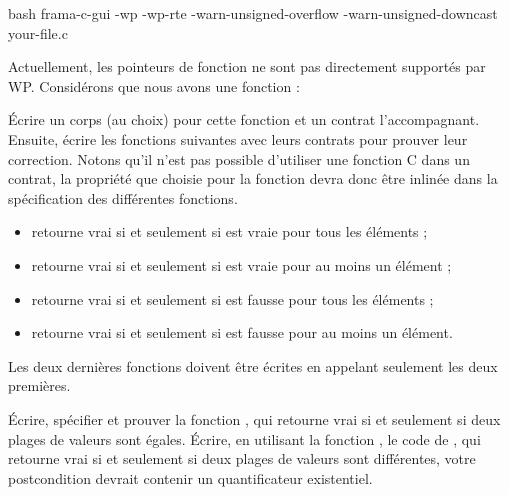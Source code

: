 \begin{CodeBlock}{bash}
frama-c-gui -wp -wp-rte -warn-unsigned-overflow -warn-unsigned-downcast your-file.c
\end{CodeBlock}




Actuellement, les pointeurs de fonction ne sont pas directement supportés par WP.
Considérons que nous avons une fonction :




Écrire un corps (au choix) pour cette fonction et un contrat l'accompagnant.
Ensuite, écrire les fonctions suivantes avec leurs contrats pour prouver leur
correction. Notons qu'il n'est pas possible d'utiliser une fonction C dans un
contrat, la propriété que choisie pour la fonction 
devra donc être inlinée dans la spécification des différentes fonctions.


\begin{itemize}
\item {} retourne vrai si et seulement si 
  est vraie pour tous les éléments ;
\item {} retourne vrai si et seulement si 
  est vraie pour au moins un élément ;
\item {} retourne vrai si et seulement si 
  est fausse pour tous les éléments ;
\item {} retourne vrai si et seulement si 
  est fausse pour au moins un élément.
\end{itemize}


Les deux dernières fonctions doivent être écrites en appelant seulement les deux
premières.






Écrire, spécifier et prouver la fonction , qui retourne vrai
si et seulement si deux plages de valeurs sont égales. Écrire, en utilisant la
fonction , le code de , qui retourne vrai
si et seulement si deux plages de valeurs sont différentes, votre postcondition
devrait contenir un quantificateur existentiel.




